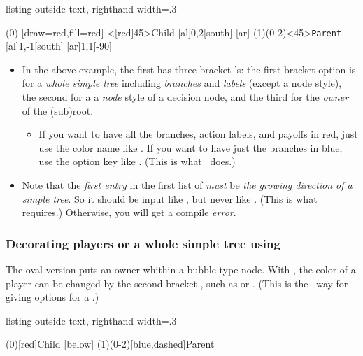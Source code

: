 \begin{tcblisting}{listing outside text, righthand width=.3\linewidth}
\begin{istgame}
(0) %
        [draw=red,fill=red] %
        <[red]45>{Child}    %
  [al]{0,2}[south]  
  [ar]
  \endist
\istroot[south,draw=blue](1)(0-2)<45>{\texttt{Parent}}
  [al]{1,-1}[south]  
  [ar]{1,1}[-90]  
  \endist
\end{istgame}
\end{tcblisting}
\remark 
\begin{itemize}
\item In the above example, the first \cmd{\istroot} has three bracket \xw{[option]}'s: the first bracket option is for a \emph{whole simple tree} including \emph{branches} and \emph{labels} (except a node style), the second for a a \emph{node} style of a decision node, and the third for the \emph{owner} of the (sub)root.
  \begin{itemize}
  \item If you want to have all the branches, action labels, and payoffs in red, 
        just use the color name like .
        If you want to have just the branches in blue, use the  option key like \xw{[south,draw=blue]}.
        (This is what \TikZ\ does.)
  \end{itemize}
\item Note that the \emph{first entry} in the first \xw{[option]} list of \cmd{\istroot} \emph{must} be \emph{the growing direction of a simple tree}. So it should be input like , but never like .
(This is what \cmd{\istroot} requires.) Otherwise, you will get a compile \emph{error}.
\end{itemize}

\subsubsection{Decorating players or a whole simple tree using \protect\cmd{\istrooto}}

The oval version \icmd{\istrooto} puts an owner whithin a bubble type node.
With \cmd{\istrooto}, the color of a player can be changed by the second bracket \xw{[option]}, such as \xw{[red]} or \xw{[blue]}.
(This is the \TikZ\ way for giving options for a .)

\begin{tcblisting}{listing outside text, righthand width=.3\linewidth}
\begin{istgame}
\istrooto(0)[red]{Child}
  [below]    \endist
\istrooto(1)(0-2)[blue,dashed]{Parent}
  \istb  \istb  \endist
\end{istgame}
\end{tcblisting}

